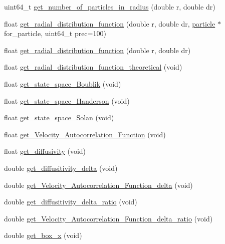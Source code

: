 \begin{DoxyCompactItemize}
\item 
uint64\+\_\+t \mbox{\hyperlink{classClassSiec_a0c89392852117a823a1a603f4181b3a7}{get\+\_\+number\+\_\+of\+\_\+particles\+\_\+in\+\_\+radius}} (double r, double dr)
\item 
float \mbox{\hyperlink{classClassSiec_a1a3c05e29d9fb646f1733704db81933d}{get\+\_\+radial\+\_\+distribution\+\_\+function}} (double r, double dr, \mbox{\hyperlink{structparticle}{particle}} $\ast$for\+\_\+particle, uint64\+\_\+t prec=100)
\item 
float \mbox{\hyperlink{classClassSiec_a95685407da49bfa4d1a54fd248e8aee3}{get\+\_\+radial\+\_\+distribution\+\_\+function}} (double r, double dr)
\item 
float \mbox{\hyperlink{classClassSiec_a87284d96c487a462bf8a42d81fc4bb8c}{get\+\_\+radial\+\_\+distribution\+\_\+function\+\_\+theoretical}} (void)
\item 
float \mbox{\hyperlink{classClassSiec_a8fb2e1fa04229aaa6027fed8dd996aea}{get\+\_\+state\+\_\+space\+\_\+\+Boublik}} (void)
\item 
float \mbox{\hyperlink{classClassSiec_a36144a1734674d3f0c6899c348da1a97}{get\+\_\+state\+\_\+space\+\_\+\+Handerson}} (void)
\item 
float \mbox{\hyperlink{classClassSiec_a3a0171519c3557d8edec22edb5978c9c}{get\+\_\+state\+\_\+space\+\_\+\+Solan}} (void)
\item 
float \mbox{\hyperlink{classClassSiec_acffa9f63d7236490d4e214a59e443140}{get\+\_\+\+Velocity\+\_\+\+Autocorrelation\+\_\+\+Function}} (void)
\item 
float \mbox{\hyperlink{classClassSiec_a59f6ca8740aad85697541a0c9901d699}{get\+\_\+diffusivity}} (void)
\item 
double \mbox{\hyperlink{classClassSiec_a5d81d2e727712fbb0f6f596eee09f354}{get\+\_\+diffusitivity\+\_\+delta}} (void)
\item 
double \mbox{\hyperlink{classClassSiec_a21be4d09c7aa47a5d3f216509ad5feef}{get\+\_\+\+Velocity\+\_\+\+Autocorrelation\+\_\+\+Function\+\_\+delta}} (void)
\item 
double \mbox{\hyperlink{classClassSiec_ac410df30c33bfc1e1613390446e716db}{get\+\_\+diffusitivity\+\_\+delta\+\_\+ratio}} (void)
\item 
double \mbox{\hyperlink{classClassSiec_af6d6dbab3224e645c67e6c7dd2e02378}{get\+\_\+\+Velocity\+\_\+\+Autocorrelation\+\_\+\+Function\+\_\+delta\+\_\+ratio}} (void)
\item 
double \mbox{\hyperlink{classClassSiec_a44e57165a1c37b9f9073fa0334e2878d}{get\+\_\+box\+\_\+x}} (void)

\end{DoxyCompactItemize}
